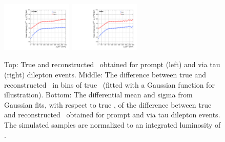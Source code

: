 \begin{figure}
\begin{center}
    \includegraphics[width=0.30\textwidth]{fig_fullRun2UL/KinRecoResolutions/ttbar_pT_multiresidual_prompt.pdf}
    \includegraphics[width=0.30\textwidth]{fig_fullRun2UL/KinRecoResolutions/ttbar_pT_multiresidual_viatau.pdf}\\
    \caption{\small Top: True and reconstructed \pttt\ obtained for prompt (left) and via tau (right) \ttbar dilepton events.
    Middle: The difference between true and reconstructed \pttt\ in bins of true \pttt\ (fitted with a Gaussian function for illustration).
    Bottom: The differential mean and sigma from Gaussian fits, with respect to true \pttt, of the difference between true and reconstructed \pttt\ obtained for prompt and via tau \ttbar dilepton events.
    The simulated samples are normalized to an integrated luminosity of \lumivalueRuniiUL.}
    \label{fig:kinrec:resolution-pttt}
 \end{center}
\end{figure}

